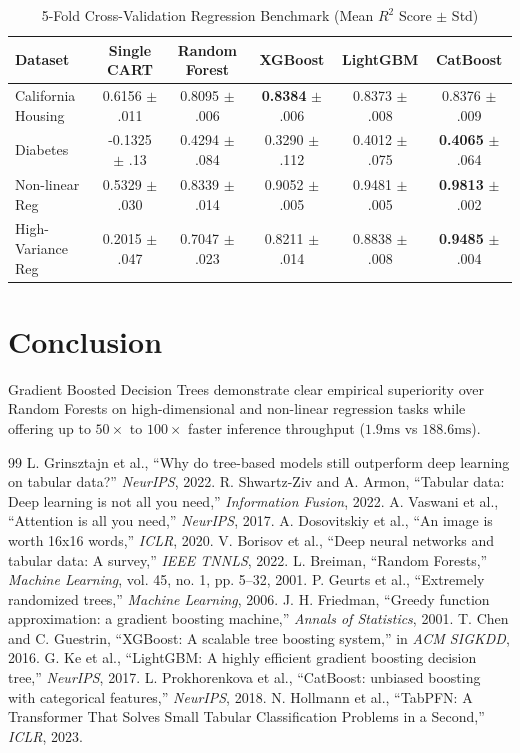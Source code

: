 \documentclass[10pt,journal,compsoc]{IEEEtran}
\begin{document}
\begin{table}[t]
\centering
\caption{5-Fold Cross-Validation Regression Benchmark (Mean $R^2$ Score $\pm$ Std)}
\label{tab:regression}
\begin{tabular}{lccccc}
\toprule
Dataset & Single CART & Random Forest & XGBoost & LightGBM & CatBoost \\
\midrule
California Housing & 0.6156 $\pm$ .011 & 0.8095 $\pm$ .006 & \textbf{0.8384} $\pm$ .006 & 0.8373 $\pm$ .008 & 0.8376 $\pm$ .009 \\
Diabetes & -0.1325 $\pm$ .13 & 0.4294 $\pm$ .084 & 0.3290 $\pm$ .112 & 0.4012 $\pm$ .075 & \textbf{0.4065} $\pm$ .064 \\
Non-linear Reg & 0.5329 $\pm$ .030 & 0.8339 $\pm$ .014 & 0.9052 $\pm$ .005 & 0.9481 $\pm$ .005 & \textbf{0.9813} $\pm$ .002 \\
High-Variance Reg & 0.2015 $\pm$ .047 & 0.7047 $\pm$ .023 & 0.8211 $\pm$ .014 & 0.8838 $\pm$ .008 & \textbf{0.9485} $\pm$ .004 \\
\bottomrule
\end{tabular}
\end{table}

\section{Conclusion}
Gradient Boosted Decision Trees demonstrate clear empirical superiority over Random Forests on high-dimensional and non-linear regression tasks while offering up to $50\times$ to $100\times$ faster inference throughput ($1.9\text{ms}$ vs $188.6\text{ms}$).

\begin{thebibliography}{99}
 L. Grinsztajn et al., ``Why do tree-based models still outperform deep learning on tabular data?'' \emph{NeurIPS}, 2022.
 R. Shwartz-Ziv and A. Armon, ``Tabular data: Deep learning is not all you need,'' \emph{Information Fusion}, 2022.
 A. Vaswani et al., ``Attention is all you need,'' \emph{NeurIPS}, 2017.
 A. Dosovitskiy et al., ``An image is worth 16x16 words,'' \emph{ICLR}, 2020.
 V. Borisov et al., ``Deep neural networks and tabular data: A survey,'' \emph{IEEE TNNLS}, 2022.
 L. Breiman, ``Random Forests,'' \emph{Machine Learning}, vol. 45, no. 1, pp. 5--32, 2001.
 P. Geurts et al., ``Extremely randomized trees,'' \emph{Machine Learning}, 2006.
 J. H. Friedman, ``Greedy function approximation: a gradient boosting machine,'' \emph{Annals of Statistics}, 2001.
 T. Chen and C. Guestrin, ``XGBoost: A scalable tree boosting system,'' in \emph{ACM SIGKDD}, 2016.
 G. Ke et al., ``LightGBM: A highly efficient gradient boosting decision tree,'' \emph{NeurIPS}, 2017.
 L. Prokhorenkova et al., ``CatBoost: unbiased boosting with categorical features,'' \emph{NeurIPS}, 2018.
 N. Hollmann et al., ``TabPFN: A Transformer That Solves Small Tabular Classification Problems in a Second,'' \emph{ICLR}, 2023.
\end{thebibliography}
\end{document}
